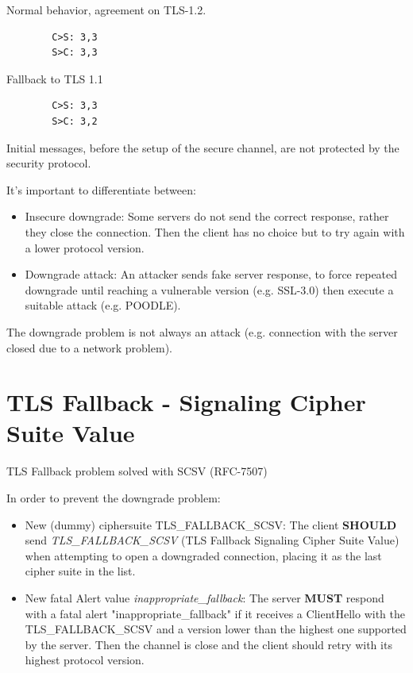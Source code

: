 \begin{multicols}{2}
    \raggedcolumns

    \begin{center}
        Normal behavior, agreement on TLS-1.2.
    \end{center}

    \begin{verbatim}
        C>S: 3,3
        S>C: 3,3
    \end{verbatim}
    \columnbreak

    \begin{center}
        Fallback to TLS 1.1
    \end{center}
    \begin{verbatim}
        C>S: 3,3
        S>C: 3,2
    \end{verbatim}
\end{multicols}
\begin{tcolorbox}[colback=red!10!white, colframe=red!70!black, coltitle=white, title=Beware]
Initial messages, before the setup of the secure channel, are not protected by the security protocol.
\end{tcolorbox}

\noindent It's important to differentiate between:
\begin{itemize}
    \item Insecure downgrade: Some servers do not send the correct response, rather they close the connection. Then the client has no choice but to try again with a lower protocol version.
    \item Downgrade attack: An attacker sends fake server response, to force repeated downgrade until reaching a vulnerable version (e.g. SSL-3.0) then execute a suitable attack (e.g. POODLE).
\end{itemize}
The downgrade problem is not always an attack (e.g. connection with the server closed due to a network problem).

\section{TLS Fallback - Signaling Cipher Suite Value}
\begin{center}
    TLS Fallback problem solved with SCSV (RFC-7507)
\end{center}

\noindent In order to prevent the downgrade problem:
\begin{itemize}
    \item New (dummy) ciphersuite TLS\_FALLBACK\_SCSV: The client \textbf{SHOULD} send \newline \textit{TLS\_FALLBACK\_SCSV} (TLS Fallback Signaling Cipher Suite Value) when attempting to open a downgraded connection, placing it as the last cipher suite in the list.
    \item New fatal Alert value \textit{inappropriate\_fallback}: The server \textbf{MUST} respond with a fatal alert "inappropriate\_fallback" if it receives a ClientHello with the TLS\_FALLBACK\_SCSV and a version lower than the highest one supported by the server. Then the channel is close and the client should retry with its highest protocol version.
\end{itemize}

